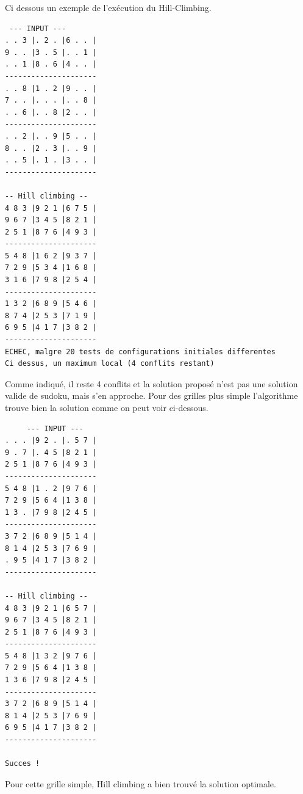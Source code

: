 \documentclass[a4paper,10pt]{article}
\begin{document}
Ci dessous un exemple de l'exécution du Hill-Climbing.
\begin{verbatim}
 --- INPUT ---
. . 3 |. 2 . |6 . . |
9 . . |3 . 5 |. . 1 |
. . 1 |8 . 6 |4 . . |
---------------------
. . 8 |1 . 2 |9 . . |
7 . . |. . . |. . 8 |
. . 6 |. . 8 |2 . . |
---------------------
. . 2 |. . 9 |5 . . |
8 . . |2 . 3 |. . 9 |
. . 5 |. 1 . |3 . . |
---------------------

-- Hill climbing --
4 8 3 |9 2 1 |6 7 5 |
9 6 7 |3 4 5 |8 2 1 |
2 5 1 |8 7 6 |4 9 3 |
---------------------
5 4 8 |1 6 2 |9 3 7 |
7 2 9 |5 3 4 |1 6 8 |
3 1 6 |7 9 8 |2 5 4 |
---------------------
1 3 2 |6 8 9 |5 4 6 |
8 7 4 |2 5 3 |7 1 9 |
6 9 5 |4 1 7 |3 8 2 |
---------------------
ECHEC, malgre 20 tests de configurations initiales differentes
Ci dessus, un maximum local (4 conflits restant)
\end{verbatim}
Comme indiqué, il reste 4 conflits et la solution proposé n'est pas une solution valide de sudoku, mais s'en approche.
Pour des grilles plus simple l'algorithme trouve bien la solution comme on peut voir ci-dessous.
\begin{verbatim}
	 --- INPUT ---
. . . |9 2 . |. 5 7 |
9 . 7 |. 4 5 |8 2 1 |
2 5 1 |8 7 6 |4 9 3 |
---------------------
5 4 8 |1 . 2 |9 7 6 |
7 2 9 |5 6 4 |1 3 8 |
1 3 . |7 9 8 |2 4 5 |
---------------------
3 7 2 |6 8 9 |5 1 4 |
8 1 4 |2 5 3 |7 6 9 |
. 9 5 |4 1 7 |3 8 2 |
---------------------

-- Hill climbing --
4 8 3 |9 2 1 |6 5 7 |
9 6 7 |3 4 5 |8 2 1 |
2 5 1 |8 7 6 |4 9 3 |
---------------------
5 4 8 |1 3 2 |9 7 6 |
7 2 9 |5 6 4 |1 3 8 |
1 3 6 |7 9 8 |2 4 5 |
---------------------
3 7 2 |6 8 9 |5 1 4 |
8 1 4 |2 5 3 |7 6 9 |
6 9 5 |4 1 7 |3 8 2 |
---------------------

Succes !
\end{verbatim}
Pour cette grille simple, Hill climbing a bien trouvé la solution optimale.
\end{document}

